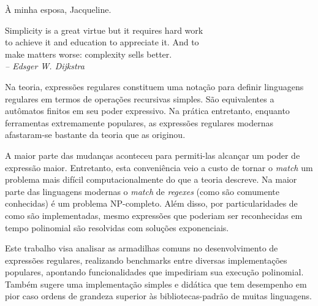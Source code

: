 \documentclass[a4paper,12pt,oneside,onecolumn]{uerj}
\begin{document}
\renewcommand*{\lstlistingname}{Listagem}
\frontmatter
\capa
\folhaderosto

%

\begin{folhadeaprovacao}
\end{folhadeaprovacao}


  \vfill\vfill
    \hfill À minha esposa, Jacqueline.
  \vfill


\pretextualchapter{}

  \vfill\vfill\vfill\vfill
  \begin{flushright}
     Simplicity is a great virtue but it requires hard work\\
     to achieve it and education to appreciate it. And to \\
     make matters worse: complexity sells better.\\
    \textsl{-- Edsger W. Dijkstra}
  \end{flushright}
  \vfill




Na teoria, expressões regulares constituem uma notação para definir linguagens regulares em termos de operações recursivas simples. São equivalentes a autômatos finitos em seu poder expressivo. Na prática entretanto, enquanto ferramentas extremamente populares, as expressões regulares modernas afastaram-se bastante da teoria que as originou. 

A maior parte das mudanças aconteceu para permiti-las alcançar um poder de expressão maior. Entretanto, esta conveniência veio a custo de tornar o \emph{match} um problema mais difícil computacionalmente do que a teoria descreve. Na maior parte das linguagens modernas o \emph{match} de \emph{regexes} (como são comumente conhecidas) é um problema NP-completo. Além disso, por particularidades de como são implementadas, mesmo expressões que poderiam ser reconhecidas em tempo polinomial são resolvidas com soluções exponenciais. 

Este trabalho visa analisar as armadilhas comuns no desenvolvimento de expressões regulares, realizando benchmarks entre diversas implementações populares, apontando funcionalidades que impediriam sua execução polinomial. Também sugere uma implementação simples e didática que tem desempenho em pior caso ordens de grandeza superior às bibliotecas-padrão de muitas linguagens.
\end{document}
